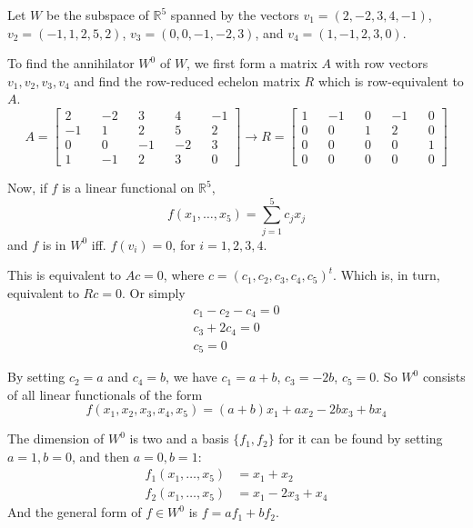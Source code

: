 \begin{example}
	Let $W$ be the subspace of $\mathbb{R}^5$ spanned by the vectors $v_1 = (2, -2, 3, 4, -1)$, $v_2 = (-1, 1, 2, 5, 2)$, $v_3 = (0, 0, -1, -2, 3)$, and $v_4 = (1, -1, 2, 3, 0)$.

	To find the annihilator $W^0$ of $W$, we first form a matrix $A$ with row vectors $v_1, v_2, v_3, v_4$ and find the row-reduced echelon matrix $R$ which is row-equivalent to $A$.
	\[
		A = \begin{bmatrix}
			2 && -2 && 3 && 4 && -1 \\
			-1 && 1 && 2 && 5 && 2 \\
			0 && 0 && -1 && -2 && 3 \\
			1 && -1 && 2 && 3 && 0
		\end{bmatrix}
		\longrightarrow
		R = \begin{bmatrix}
			1 && -1 && 0 && -1 && 0 \\
			0 && 0 && 1 && 2 && 0 \\
			0 && 0 && 0 && 0 && 1 \\
			0 && 0 && 0 && 0 && 0
		\end{bmatrix}
	\]

	Now, if $f$ is a linear functional on $\mathbb{R}^5$, 
	\[
		f(x_1, \ldots, x_5) = \sum_{j=1}^5 c_j x_j
	\]
	and $f$ is in $W^0$ iff. $f(v_i) = 0$, for $i = 1,2,3,4$.
	
	This is equivalent to $Ac = 0$, where $c = (c_1, c_2, c_3, c_4, c_5)^t$. Which is, in turn, equivalent to $Rc = 0$. Or simply
	\begin{equation*}
		\begin{aligned}
			c_1 - c_2 - c_4 = 0 \\
			c_3 + 2 c_4 = 0 \\
			c_5 = 0
		\end{aligned}
	\end{equation*}

	By setting $c_2 = a$ and $c_4 = b$, we have $c_1 = a+b$, $c_3 = -2b$, $c_5 = 0$. So $W^0$ consists of all linear functionals of the form
	\[
		f(x_1, x_2, x_3, x_4, x_5) = (a+b)x_1 + ax_2 - 2bx_3 + bx_4
	\]

	The dimension of $W^0$ is two and a basis $\{ f_1, f_2 \}$ for it can be found by setting $a = 1, b = 0$, and then $a = 0, b = 1$:
	\begin{equation*}
		\begin{aligned}
			f_1(x_1, \ldots, x_5) &= x_1 + x_2 \\
			f_2(x_1, \ldots, x_5) &= x_1 - 2x_3 + x_4
	\end{aligned}
\end{equation*}
	And the general form of $f \in W^0$ is $f = a f_1 + bf_2$.
\end{example}


